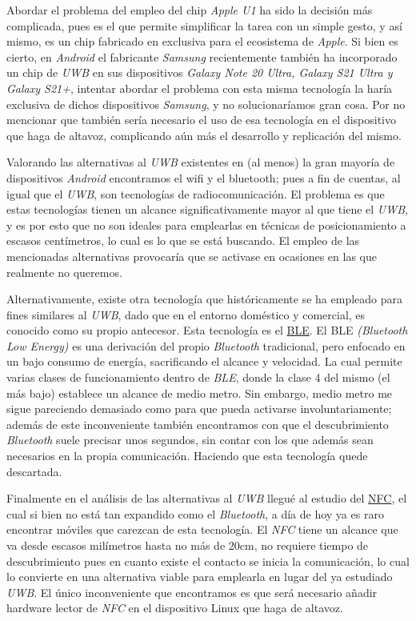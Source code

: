 Abordar el problema del empleo del chip \emph{Apple U1} ha sido la decisión más
complicada, pues es el que permite simplificar la tarea con un simple gesto, y
así mismo, es un chip fabricado en exclusiva para el ecosistema de \emph{Apple}.
Si bien es cierto, en \emph{Android} el fabricante \emph{Samsung} recientemente
también ha incorporado un chip de \emph{UWB} en sus dispositivos \emph{Galaxy
Note 20 Ultra, Galaxy S21 Ultra y Galaxy S21+}, intentar abordar el problema con
esta misma tecnología la haría exclusiva de dichos dispositivos \emph{Samsung},
y no solucionaríamos gran cosa. Por no mencionar que también sería necesario el
uso de esa tecnología en el dispositivo que haga de altavoz, complicando aún más
el desarrollo y replicación del mismo.

Valorando las alternativas al \emph{UWB} existentes en (al menos) la gran
mayoría de dispositivos \emph{Android} encontramos el wifi y el bluetooth; pues
a fin de cuentas, al igual que el \emph{UWB}, son tecnologías de
radiocomunicación. El problema es que estas tecnologías tienen un alcance
significativamente mayor al que tiene el \emph{UWB}, y es por esto que no son
ideales para emplearlas en técnicas de posicionamiento a escasos centímetros, lo
cual es lo que se está buscando. El empleo de las mencionadas alternativas
provocaría que se activase en ocasiones en las que realmente no queremos.

Alternativamente, existe otra tecnología que históricamente se ha empleado para
fines similares al \emph{UWB}, dado que en el entorno doméstico y comercial, es
conocido como su propio antecesor. Esta tecnología es el
\href{https://en.wikipedia.org/wiki/Bluetooth_Low_Energy}{BLE}.
El BLE \emph{(Bluetooth Low Energy)} es una derivación del propio
\emph{Bluetooth} tradicional, pero enfocado en un bajo consumo de energía,
sacrificando el alcance y velocidad. La cual permite varias clases de
funcionamiento dentro de \emph{BLE}, donde la clase 4 del mismo (el más bajo)
establece un alcance de medio metro. Sin embargo, medio metro me sigue
pareciendo demasiado como para que pueda activarse involuntariamente; además de
este inconveniente también encontramos con que el descubrimiento
\emph{Bluetooth} suele precisar unos segundos, sin contar con los que además
sean necesarios en la propia comunicación. Haciendo que esta tecnología quede
descartada.

Finalmente en el análisis de las alternativas al \emph{UWB} llegué al estudio
del \href{https://es.wikipedia.org/wiki/Comunicaci%C3%B3n_de_campo_cercano}{NFC}, 
el cual si bien no está tan expandido como el \emph{Bluetooth}, a día de hoy ya es raro
encontrar móviles que carezcan de esta tecnología. El \emph{NFC} tiene un alcance que
va desde escasos milímetros hasta no más de 20cm, no requiere tiempo de
descubrimiento pues en cuanto existe el contacto se inicia la comunicación, lo
cual lo convierte en una alternativa viable para emplearla en lugar del ya
estudiado \emph{UWB}. El único inconveniente que encontramos es que será
necesario añadir hardware lector de \emph{NFC} en el dispositivo Linux que haga de
altavoz.

